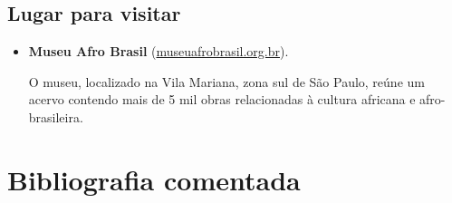 \documentclass[11pt]{extarticle}
\begin{document}
\subsection{Lugar para visitar}

\begin{itemize}
\item\textbf{Museu Afro Brasil}
(\href{http://www.museuafrobrasil.org.br/}{museuafrobrasil.org.br}).

O museu, localizado na Vila Mariana, zona sul de São Paulo, reúne um
acervo contendo mais de 5 mil obras relacionadas à cultura africana e
afro-brasileira.

\end{itemize}

\section{Bibliografia comentada}
\end{document}
